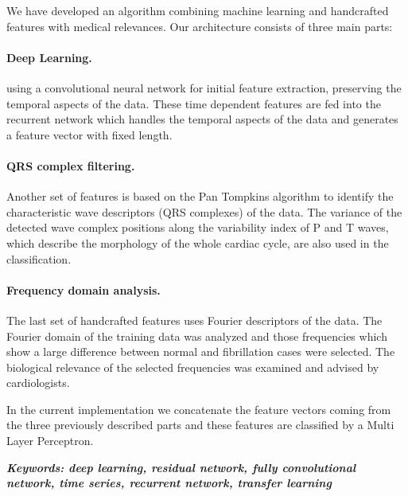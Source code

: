 We have developed an algorithm combining machine learning and handcrafted
features with medical relevances.
Our architecture consists of three main parts:

\paragraph{Deep Learning.} using a
convolutional neural network for initial feature extraction, preserving the
temporal aspects of the data. These time dependent features are fed into
the recurrent network which handles the temporal aspects of the data and
generates a feature vector with fixed length.

\paragraph{QRS complex filtering.}
Another set of features is based on the Pan Tompkins algorithm to identify the
characteristic wave descriptors (QRS complexes) of the data.
The variance of the detected wave complex positions along the variability index of P and T waves, which describe the morphology of the whole cardiac cycle, are also used in the classification.

\paragraph{Frequency domain analysis.} The last set of handcrafted features uses Fourier descriptors of the data.
The Fourier domain of the training data was analyzed and those frequencies which
show a large difference between normal and fibrillation cases were selected. The
biological relevance of the selected frequencies was examined and advised by
cardiologists.

In the current implementation we concatenate the feature vectors coming from the
three previously described parts and these features are classified by a Multi Layer Perceptron.

\textit{\textbf{Keywords: deep learning, residual network, fully convolutional network, time series, recurrent network, transfer learning}}
